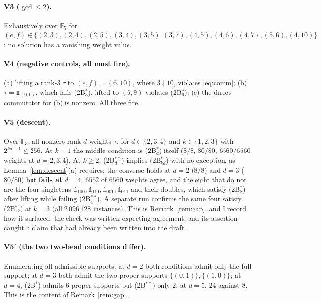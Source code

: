 \documentclass[11pt]{article}
\theoremstyle{definition}
\theoremstyle{remark}
\newcommand{\F}{\mathbb{F}}
\begin{document}
\paragraph{V3 ($\gcd\le2$).}  Exhaustively over $\F_5$ for
$(e,f)\in\{(2,3),(2,4),(2,5),(3,4),(3,5),(3,7),(4,5),(4,6),(4,7),(5,6),(4,10)\}$: no solution
has a vanishing weight value.

\paragraph{V4 (negative controls, all must fire).}
(a) lifting a rank-$3$ $\tau$ to $(e,f)=(6,10)$, where $3\nmid10$, violates \eqref{eq:comm};
(b) $\tau=\mathbb{1}_{(0,0)}$, which fails (2B$^*_3$), lifted to $(6,9)$ violates
(2B$^*_6$); (c) the direct commutator for (b) is nonzero.  All three fire.

\paragraph{V5 (descent).}  Over $\F_3$, all nonzero rank-$d$ weights $\tau$, for
$d\in\{2,3,4\}$ and $k\in\{1,2,3\}$ with $2^{kd-1}\le256$.  At $k=1$ the middle condition is
(2B$^*_d$) itself ($8/8$, $80/80$, $6560/6560$ weights at $d=2,3,4$).  At $k\ge2$,
(2B$^{**}_d$) implies (2B$^*_{kd}$) with no exception, as Lemma~\ref{lem:descent}(a)
requires; the converse holds at $d=2$ ($8/8$) and $d=3$ ($80/80$) but \textbf{fails at
$d=4$}: $6552$ of $6560$ weights agree, and the eight that do not are the four singletons
$\mathbb{1}_{100},\mathbb{1}_{110},\mathbb{1}_{001},\mathbb{1}_{011}$ and their doubles,
which satisfy (2B$^*_8$) after lifting while failing (2B$^{**}_4$).  A separate run confirms
the same four satisfy (2B$^*_{12}$) at $k=3$ (all $2\,096\,128$ instances).  This is
Remark~\ref{rem:gap}, and I record how it surfaced: the check was written expecting
agreement, and its assertion caught a claim that had already been written into the draft.

\paragraph{V5$'$ (the two two-bead conditions differ).}  Enumerating all admissible supports:
at $d=2$ both conditions admit only the full support; at $d=3$ both admit the two proper
supports $\{(0,1)\},\{(1,0)\}$; at $d=4$, (2B$^*$) admits $6$ proper supports but
(2B$^{**}$) only $2$; at $d=5$, $24$ against $8$.  This is the content of
Remark~\ref{rem:gap}.
\end{document}
